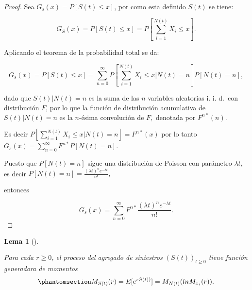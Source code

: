 \documentclass[
  us-letterpaper,
]{scrreprt}
\theoremstyle{plain}
\newtheorem{lemma}{Lema}[chapter]
\theoremstyle{plain}
\theoremstyle{definition}
\theoremstyle{remark}
\begin{document}
\begin{proof}
Sea \(G_s(x) =P[S(t) \leq x]\), por como esta definido \(S(t)\) se
tiene:

\[G_S(x) = P[S(t) \leq x] =P\left[\sum_{i=1}^{N(t)} X_i \leq x\right].\]

Aplicando el teorema de la probabilidad total se da:

\[G_s(x) =  P[S(t) \leq x] = \sum_{n=0}^{\infty} P\left[\sum_{i=1}^{N(t)} X_i \leq x | N(t) =n \right] P[N(t) = n],
\]

dado que \(S(t)|N(t) = n\) es la suma de las \(n\) variables aleatorias
i. i. d.~con distribución \(F\), por lo que la función de distribución
acumulativa de \(S(t)|N(t)=n\) es la \(n\)-ésima convolución de \(F,\)
denotada por \(F^{n*}(n)\).

Es decir
\(P\left[\sum_{i=1}^{N(t)} X_i \leq x |N(t) = n \right] = F^{n*}(x)\)
por lo tanto \(G_s(x) = \sum_{n=0}^{\infty} F^{n*} P[N(t) =n].\)

Puesto que \(P[N(t) =n]\) sigue una distribución de Poisson con
parámetro \(\lambda t\), es decir
\(P[N(t) =n] = \frac{(\lambda t)^n e^{-\lambda t}}{n!},\)

entonces

\[
G_s(x) = \sum_{n=0}^{\infty} F^{n*} \frac{(\lambda t)^n e^{-\lambda t}}{n!}.
\]
\end{proof}

\begin{lemma}[]\protect\hypertarget{lem-2}{}\label{lem-2}

Para cada \(r \geq 0\), el proceso del agregado de siniestros
\((S(t))_{t \geq 0}\) tiene función generadora de momentos
\begin{equation}\phantomsection\label{eq-1.5}{M_{S(t)}(r) = E[e^{rS(t))}] = M_{N(t)}(ln M_{x_i}(r)).}\end{equation}

\end{lemma}
\end{document}
